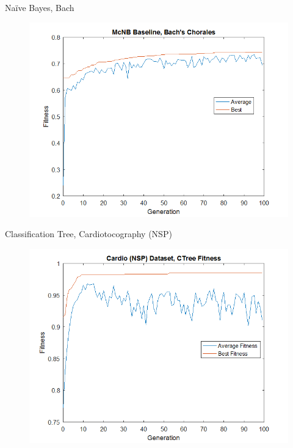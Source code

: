 \documentclass{beamer}
\begin{document}
\begin{frame} {Na\"ive Bayes, Bach}
	\begin{figure}
		\centering
		\includegraphics[width=.95\linewidth]{figures/png/fitnessBachMcNBBase}
		\label{fig:fitnessbachmcnbbase}
	\end{figure}
	
\end{frame}
\begin{frame} {Classification Tree, Cardiotocography (NSP)}
	\begin{figure}
		\centering
		\includegraphics[width=.95\linewidth]{figures/png/fitnessCardioNSPCTree}
		\label{fig:fitnessCardioNSPCtree}
	\end{figure}
	
\end{frame}
\end{document}
